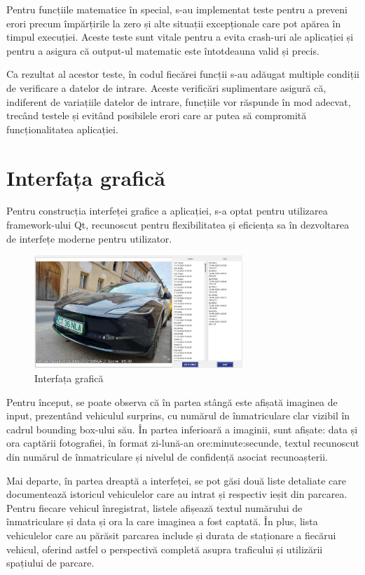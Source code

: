 \documentclass[a4paper,12pt]{report}
\begin{document}
Pentru funcțiile matematice în special, s-au implementat teste pentru a preveni erori precum împărțirile la zero și alte situații excepționale care pot apărea în timpul execuției. Aceste teste sunt vitale pentru a evita crash-uri ale aplicației și pentru a asigura că output-ul matematic este întotdeauna valid și precis.

Ca rezultat al acestor teste, în codul fiecărei funcții s-au adăugat multiple condiții de verificare a datelor de intrare. Aceste verificări suplimentare asigură că, indiferent de variațiile datelor de intrare, funcțiile vor răspunde în mod adecvat, trecând testele și evitând posibilele erori care ar putea să compromită funcționalitatea aplicației.

\section{Interfața grafică}
Pentru construcția interfeței grafice a aplicației, s-a optat pentru utilizarea framework-ului Qt, recunoscut pentru flexibilitatea și eficiența sa în dezvoltarea de interfețe moderne pentru utilizator.

\begin{figure}[h!]
    \centering
    \includegraphics[width=0.7\textwidth]{images/gui.jpg}
    \caption{Interfața grafică}
\end{figure}
\FloatBarrier

Pentru început, se poate observa că în partea stângă este afișată imaginea de input, prezentând vehiculul surprins, cu numărul de înmatriculare clar vizibil în cadrul bounding box-ului său. În partea inferioară a imaginii, sunt afișate: data și ora captării fotografiei, în format zi-lună-an ore:minute:secunde, textul recunoscut din numărul de înmatriculare și nivelul de confidență asociat recunoașterii.

Mai departe, în partea dreaptă a interfeței, se pot găsi două liste detaliate care documentează istoricul vehiculelor care au intrat și respectiv ieșit din parcarea. Pentru fiecare vehicul înregistrat, listele afișează textul numărului de înmatriculare și data și ora la care imaginea a fost captată. În plus, lista vehiculelor care au părăsit parcarea include și durata de staționare a fiecărui vehicul, oferind astfel o perspectivă completă asupra traficului și utilizării spațiului de parcare.
\end{document}
